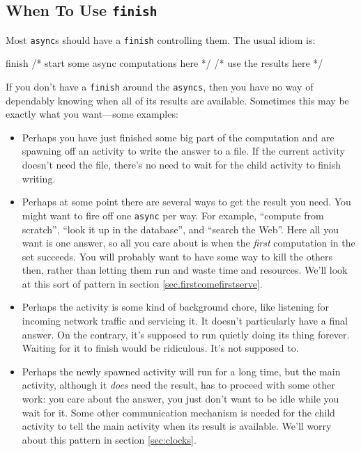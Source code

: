 \subsection{When To Use {\tt finish}}\label{ssec:whenusefinish}

Most {\tt async}s should have a {\tt finish} controlling them.
The usual idiom is: 
\begin{xten}
finish {
   /*  start some async computations here */
}
/* use the results here */
\end{xten}

If you don't have a {\tt finish} around the {\tt asyncs}, then you have no way of
dependably knowing when all of its results are available.
Sometimes this may be exactly what you want---some examples:

\begin{itemize}
\item Perhaps you have just finished some big part of the computation and are
      spawning off an activity to write the answer to a file. If the current activity
      doesn't need the file, there's no need
      to wait for the child activity to finish writing.

\item Perhaps at some point there are several ways to get the result you need.
	You might want to fire off one {\tt async} per way.  For example, ``compute from
	scratch'', ``look it up in the database'', and ``search the Web''.
	Here all you want is one  answer, so all you care about is when the {\em first}
	computation in the set succeeds.  You will probably want to have some way
       to kill the others then, rather than letting them run and
       waste time and resources.   We'll look at this sort of pattern in section
      \ref{sec.firstcomefirstserve}.

\item Perhaps the activity is some kind of background chore, like listening
	for incoming network traffic and servicing it.  It doesn't particularly have
	a final answer.  On the contrary, it's supposed to run quietly doing its
	thing forever.  Waiting for it to finish would be ridiculous.  It's not supposed to.

\item Perhaps the newly spawned activity will run for a long time, but the main 
      activity, although it {\em does} need the result, has to proceed with some
      other work: you care  about the answer, you just don't want to be idle
      while you wait for it.  Some other communication mechanism is needed
      for the child activity to tell the
      main activity when its result is available.  We'll worry about
      this pattern in section \ref{sec:clocks}.
\end{itemize}

